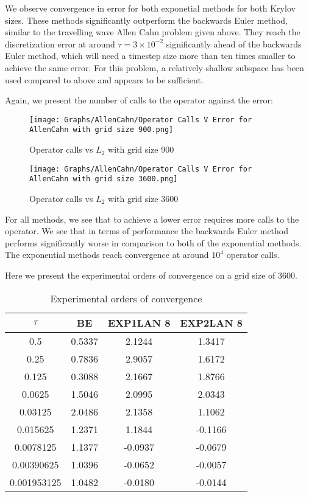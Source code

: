 We observe convergence in error for both exponetial methods for both Krylov sizes.
These methods significantly outperform the backwards Euler method, similar to the travelling wave Allen Cahn problem given above.
They reach the discretization error at around $\tau=3\times10^{-2}$ significantly ahead of the backwards Euler method, which will need a timestep size more than ten times smaller to achieve the same error.
For this problem, a relatively shallow subspace has been used compared to above and appears to be sufficient.

Again, we present the number of calls to the operator against the error:
\begin{figure}[H]
    \centering
    \begin{minipage}{0.49\textwidth}
        \texttt{[image: Graphs/AllenCahn/Operator Calls V Error for AllenCahn with grid size 900.png]} %
        \caption{Operator calls vs $L_2$ with grid size 900}
        \label{fig:plot1}
    \end{minipage}\hfill
    \centering
    \begin{minipage}{0.49\textwidth}
        \texttt{[image: Graphs/AllenCahn/Operator Calls V Error for AllenCahn with grid size 3600.png]} %
        \caption{Operator calls vs $L_2$ with grid size 3600}
        \label{fig:plot2}
    \end{minipage}\hfill
\end{figure}
For all methods, we see that to achieve a lower error requires more calls to the operator.
We see that in terms of performance the backwards Euler method performs significantly worse in comparison to both of the exponential methods.
The exponential methods reach convergence at around $10^4$ operator calls.

Here we present the experimental orders of convergence on a grid size of 3600.

\begin{table}[H]
    \centering
    \begin{tabular}{| c | c | c | c |}
    \hline
    $\tau$ & BE & EXP1LAN 8 & EXP2LAN 8 \\
    \hline
    0.5 & 0.5337 & 2.1244    & 1.3417 \\
    0.25 & 0.7836 & 2.9057    & 1.6172 \\
    0.125 & 0.3088 & 2.1667   & 1.8766 \\
    0.0625 & 1.5046  & 2.0995   & 2.0343 \\
    0.03125 & 2.0486 & 2.1358     & 1.1062 \\
    0.015625 & 1.2371  & 1.1844    & -0.1166 \\
    0.0078125 & 1.1377 & -0.0937 & -0.0679 \\
    0.00390625 & 1.0396 & -0.0652 & -0.0057 \\
    0.001953125 & 1.0482 & -0.0180 & -0.0144 \\
    \hline
    \end{tabular}
    \caption{Experimental orders of convergence}
    \label{tab:reduced_data}
\end{table}


